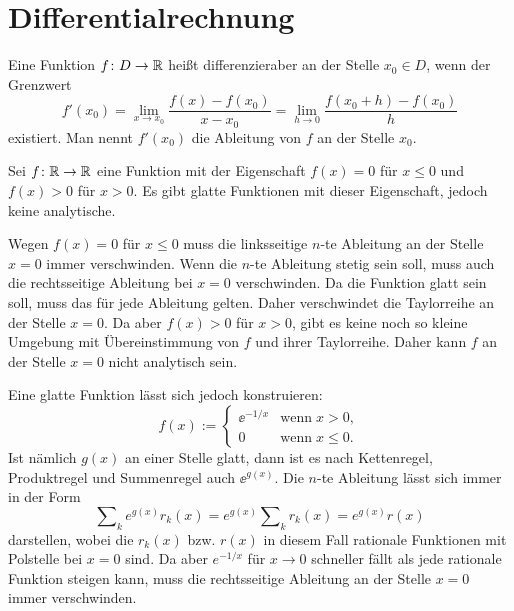 \newpage
\section{Differentialrechnung}
\begin{Definition}\label{diff}
Eine Funktion $f\colon D\to\mathbb R$ heißt differenzieraber an der Stelle
$x_0\in D$, wenn der Grenzwert
\[f'(x_0) = \lim_{x\to x_0}\frac{f(x)-f(x_0)}{x-x_0}
= \lim_{h\to 0}\frac{f(x_0+h)-f(x_0)}{h}\]
existiert. Man nennt $f'(x_0)$ die Ableitung von $f$ an der Stelle
$x_0$.
\end{Definition}

\begin{Satz}
Sei $f\colon\mathbb R\to\mathbb R$ eine Funktion mit der Eigenschaft
$f(x)=0$ für $x\le 0$ und $f(x)>0$ für $x>0$. Es gibt glatte Funktionen
mit dieser Eigenschaft, jedoch keine analytische.
\end{Satz}

\begin{Beweis}
Wegen $f(x)=0$ für $x\le 0$ muss die linksseitige $n$-te Ableitung
an der Stelle $x=0$ immer verschwinden. Wenn die $n$-te Ableitung
stetig sein soll, muss auch die rechtsseitige Ableitung bei $x=0$
verschwinden. Da die Funktion glatt sein soll, muss das für jede
Ableitung gelten. Daher verschwindet die Taylorreihe an der Stelle
$x=0$. Da aber $f(x)>0$ für $x>0$, gibt es keine noch so kleine
Umgebung mit Übereinstimmung von $f$ und ihrer Taylorreihe.
Daher kann $f$ an der Stelle $x=0$ nicht analytisch sein.

Eine glatte Funktion lässt sich jedoch konstruieren:
\[f(x):=\begin{cases}
\ee^{-1/x}&\text{wenn}\;x>0,\\
0&\text{wenn}\;x\le 0.
\end{cases}\]
Ist nämlich $g(x)$ an einer Stelle glatt, dann ist
es nach Kettenregel, Produktregel und Summenregel auch $\ee^{g(x)}$.
Die $n$-te Ableitung lässt sich immer in der Form
\[\sum\nolimits_k e^{g(x)}{r_k(x)}
= e^{g(x)}\sum\nolimits_k r_k(x) = e^{g(x)}r(x)\]
darstellen, wobei die $r_k(x)$ bzw. $r(x)$ in diesem Fall rationale
Funktionen mit Polstelle bei $x=0$ sind. Da aber $e^{-1/x}$ für
$x\to 0$ schneller fällt als jede rationale Funktion steigen kann,
muss die rechtsseitige Ableitung an der Stelle $x=0$ immer
verschwinden.\;\qedsymbol
\end{Beweis}

